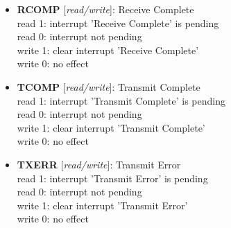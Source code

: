 \vspace{12pt}
\noindent
{}

\begin{itemize}
\item \begin{small}
{\bf 
RCOMP
} [\emph{read/write}]: Receive Complete
\\
read 1: interrupt 'Receive Complete' is pending\\read 0: interrupt not pending\\write 1: clear interrupt 'Receive Complete'\\write 0: no effect
\end{small}
\item \begin{small}
{\bf 
TCOMP
} [\emph{read/write}]: Transmit Complete
\\
read 1: interrupt 'Transmit Complete' is pending\\read 0: interrupt not pending\\write 1: clear interrupt 'Transmit Complete'\\write 0: no effect
\end{small}
\item \begin{small}
{\bf 
TXERR
} [\emph{read/write}]: Transmit Error
\\
read 1: interrupt 'Transmit Error' is pending\\read 0: interrupt not pending\\write 1: clear interrupt 'Transmit Error'\\write 0: no effect
\end{small}
\end{itemize}

